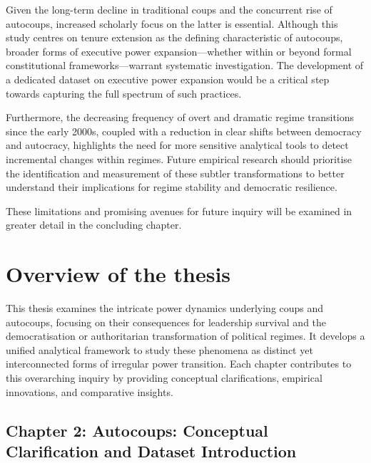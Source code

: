 \documentclass[
  12pt,
]{report}
\begin{document}
Given the long-term decline in traditional coups and the concurrent rise
of autocoups, increased scholarly focus on the latter is essential.
Although this study centres on tenure extension as the defining
characteristic of autocoups, broader forms of executive power
expansion---whether within or beyond formal constitutional
frameworks---warrant systematic investigation. The development of a
dedicated dataset on executive power expansion would be a critical step
towards capturing the full spectrum of such practices.

Furthermore, the decreasing frequency of overt and dramatic regime
transitions since the early 2000s, coupled with a reduction in clear
shifts between democracy and autocracy, highlights the need for more
sensitive analytical tools to detect incremental changes within regimes.
Future empirical research should prioritise the identification and
measurement of these subtler transformations to better understand their
implications for regime stability and democratic resilience.

These limitations and promising avenues for future inquiry will be
examined in greater detail in the concluding chapter.

\section{Overview of the thesis}\label{overview-of-the-thesis}

This thesis examines the intricate power dynamics underlying coups and
autocoups, focusing on their consequences for leadership survival and
the democratisation or authoritarian transformation of political
regimes. It develops a unified analytical framework to study these
phenomena as distinct yet interconnected forms of irregular power
transition. Each chapter contributes to this overarching inquiry by
providing conceptual clarifications, empirical innovations, and
comparative insights.

\subsection*{Chapter 2: Autocoups: Conceptual Clarification and Dataset
Introduction}\label{chapter-2-autocoups-conceptual-clarification-and-dataset-introduction}
\end{document}
